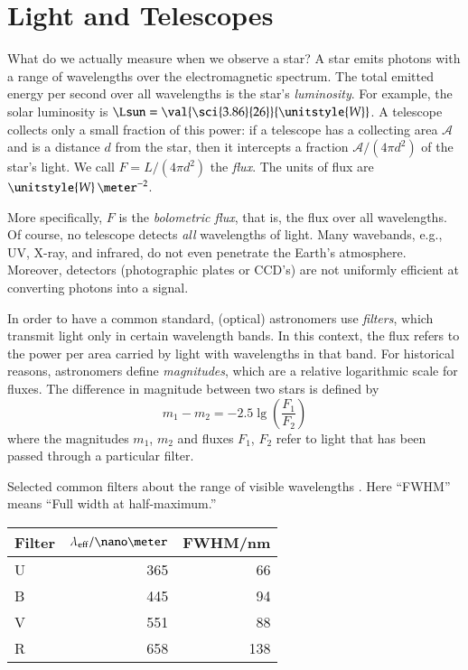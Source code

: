 \chapter{Light and Telescopes}\label{ch.light-telescopes}

What do we actually measure when we observe a star? A star emits photons with a range of wavelengths over the electromagnetic spectrum.  The total emitted energy per second over all wavelengths is the star's \emph{luminosity}.  For example, the solar luminosity is $\Lsun = \val{\sci{3.86}{26}}{\unitstyle{W}}$.  A telescope collects only a small fraction of this power: if a telescope has a collecting area $\mathcal{A}$ and is a distance $d$ from the star, then it intercepts a fraction $\mathcal{A}/(4\pi d^{2})$ of the star's light.  We call $F = L/(4\pi d^{2})$ the \emph{flux}. The units of flux are $\unitstyle{W}\,\meter^{-2}$.

More specifically, $F$ is the \emph{bolometric flux}, that is, the flux over all wavelengths.  Of course, no telescope detects \emph{all} wavelengths of light. Many wavebands, e.g., UV, X-ray, and infrared, do not even penetrate the Earth's atmosphere.  Moreover, detectors (photographic plates or CCD's) are not uniformly efficient at converting photons into a signal.

In order to have a common standard, (optical) astronomers use \emph{filters}, which transmit light only in certain wavelength bands. In this context, the flux refers to the power per area carried by light with wavelengths in that band.  For historical reasons, astronomers define \emph{magnitudes}, which are a relative logarithmic scale for fluxes.  The difference in magnitude between two stars is defined by
\begin{equation}\label{e.magnitude-def}
	m_{1} - m_{2} = -2.5\lg\left(\frac{F_{1}}{F_{2}}\right)
\end{equation}
where the magnitudes $m_{1}$, $m_{2}$ and fluxes $F_{1}$, $F_{2}$ refer to light that has been passed through a particular filter.

\begin{margintable}
\label{t.ubvr}\caption{Selected common filters about the range of visible wavelengths \citep{Binney1998Galactic-Astron}.  Here ``FWHM'' means ``Full width at half-maximum.''}
\begin{tabular}{lrr}
\hline
Filter & $\lambda_{\mathrm{eff}}/\nano\meter$ & FWHM/nm \\
\hline\hline
U & 365 &  66\\
B & 445 &  94\\
V & 551 &  88\\
R & 658 & 138\\
\hline
\end{tabular}
\end{margintable}


